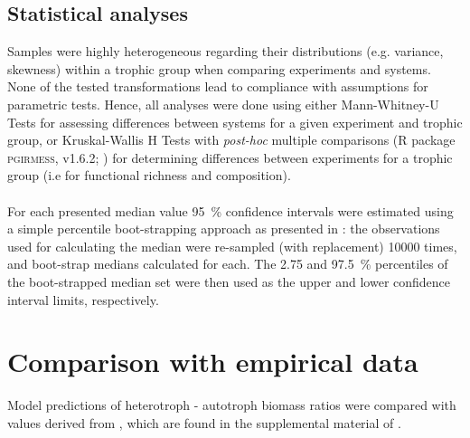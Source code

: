 \subsection{Statistical analyses}
\label{chap:mat:analysis:stats}
Samples were highly heterogeneous regarding their distributions (e.g. variance, skewness) within a trophic group when comparing experiments and systems. None of the tested transformations lead to compliance with assumptions for parametric tests. Hence, all analyses were done using either Mann-Whitney-U Tests \citep{Hollander2013} for assessing differences between systems for a given experiment and trophic group, or 
Kruskal-Wallis H Tests with \textit{post-hoc} multiple comparisons (R package \textsc{pgirmess}, v1.6.2; \citealp{Siegel1988}) for determining differences between experiments for a trophic group (i.e for functional richness and composition). \\\\
For each presented median value 95~\% confidence intervals were estimated using a simple percentile boot-strapping approach as presented in \cite{Carpenter2000}: the observations used for calculating the median were re-sampled (with replacement) 10000 times, and boot-strap medians calculated for each. The 2.75 and 97.5~\% percentiles of the boot-strapped median set were then used as the upper and lower confidence interval limits, respectively. 
\section{Comparison with empirical data}
\label{chap:mat:emp}
Model predictions of heterotroph - autotroph biomass ratios were compared with values derived from \cite{Cebrian2009}, which are found in the supplemental material of \cite{Harfoot2014}.

